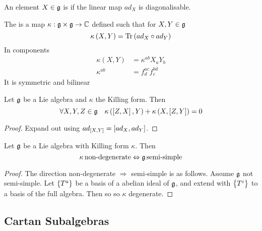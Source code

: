 \documentclass{article}
\begin{document}
\begin{definition}[ad-diagonalisable]
An element $X\in\mf{g}$ is  if the linear map $ad_X$ is diagonalisable. 
\end{definition}

\begin{definition}
The  is a map $\kappa:\mf{g}\times\mf{g}\to\mbb{C}$ defined such that for $X,Y\in\mf{g}$
\[
\kappa\left(X,Y\right)=\tr\left(ad_X \circ ad_Y\right)
\]
In components 
\begin{align*}
    \kappa(X,Y) &= \kappa^{ab}X_a Y_b \\
    \kappa^{ab} &= f^{ac}_d f^{bd}_c
\end{align*}
It is symmetric and bilinear 
\end{definition}

\begin{theorem}
Let $\mf{g}$ be a Lie algebra and $\kappa$ the Killing form. Then
\[
\forall X,Y,Z\in\mf{g} \quad \kappa\left(\comm[Z]{X},Y\right)+\kappa\left(X,\comm[Z]{Y}\right)=0
\]
\end{theorem}
\begin{proof}
Expand out using $ad_{\comm[X]{Y}} = \comm[ad_X]{ad_Y}$. 
\end{proof}

\begin{theorem}[Cartan]
Let $\mf{g}$ be a Lie algebra with Killing form $\kappa$. Then 
\[
\kappa \, \text{non-degenerate} \Leftrightarrow \mf{g} \, \text{semi-simple}
\]
\end{theorem}
\begin{proof}
The direction non-degenerate $\Rightarrow$ semi-simple is as follows. Assume $\mf{g}$ not semi-simple. Let $\pbrace{T^a}$ be a basis of a abelian ideal of $\mf{g}$, and extend with $\pbrace{T^i}$ to a basis of the full algebra. Then
so
so $\kappa$ degenerate. 
\end{proof}

\subsection{Cartan Subalgebras}
\end{document}
